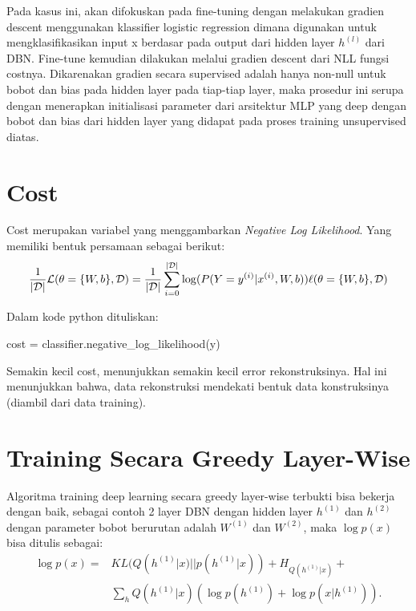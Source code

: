 Pada kasus ini, akan difokuskan pada fine-tuning dengan melakukan gradien descent menggunakan klassifier logistic regression dimana digunakan untuk mengklasifikasikan input x berdasar pada output dari hidden layer $h^{(l)}$ dari DBN. Fine-tune kemudian dilakukan melalui gradien descent dari NLL fungsi costnya. Dikarenakan gradien secara supervised adalah hanya non-null untuk bobot dan bias pada hidden layer pada tiap-tiap layer, maka prosedur ini serupa dengan menerapkan initialisasi parameter dari arsitektur MLP yang deep dengan bobot dan bias dari hidden layer yang didapat pada proses training unsupervised diatas.

\section{Cost}
Cost merupakan variabel yang menggambarkan \textit{Negative Log Likelihood}. Yang memiliki bentuk persamaan sebagai berikut:
\begin{equation}
\frac{1}{|\mathcal{D}|} \mathcal{L} (\theta=\{W,b\}, \mathcal{D}) =
            \frac{1}{|\mathcal{D}|} \sum_{i=0}^{|\mathcal{D}|}
                \log(P(Y=y^{(i)}|x^{(i)}, W,b)) \\
            \ell (\theta=\{W,b\}, \mathcal{D})
\end{equation}

Dalam kode python dituliskan:
\begin{center}
cost = classifier.negative\_log\_likelihood(y)
\end{center}

Semakin kecil cost, menunjukkan semakin kecil error rekonstruksinya. Hal ini menunjukkan bahwa, data rekonstruksi mendekati bentuk data konstruksinya (diambil dari data training).


\section{Training Secara Greedy Layer-Wise}

Algoritma training deep learning secara greedy layer-wise terbukti bisa bekerja dengan baik, sebagai contoh 2 layer DBN dengan hidden layer $h^{(1)}$ dan $h^{(2)}$ dengan parameter bobot berurutan adalah $W^{(1)}$ dan $W^{(2)}$, \citep{hinton2006reducing} maka $\log
p(x)$ bisa ditulis sebagai:
\begin{equation}
\begin{aligned}
\log p(x) = &KL(Q(h^{(1)}|x)||p(h^{(1)}|x)) + H_{Q(h^{(1)}|x)} + \\
            &\sum_h Q(h^{(1)}|x)(\log p(h^{(1)}) + \log p(x|h^{(1)})).
\end{aligned}
\label{eq:equ2}
\end{equation}

